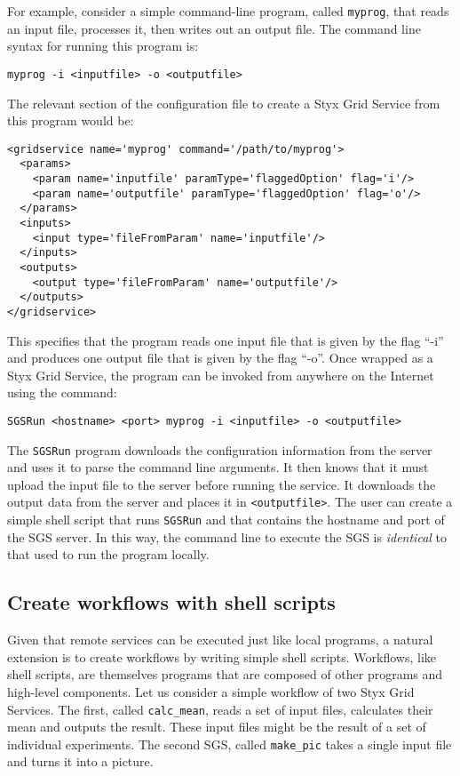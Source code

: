 \documentclass{llncs}
\begin{document}
For example, consider a simple command-line program, called {\tt myprog}, that reads an input file, processes it, then writes out an output file.  The command line syntax for running this program is:

\begin{verbatim}
myprog -i <inputfile> -o <outputfile>
\end{verbatim}

The relevant section of the configuration file to create a Styx Grid Service from this program would be:

\begin{verbatim}
<gridservice name='myprog' command='/path/to/myprog'>
  <params>
    <param name='inputfile' paramType='flaggedOption' flag='i'/>
    <param name='outputfile' paramType='flaggedOption' flag='o'/>
  </params>
  <inputs>
    <input type='fileFromParam' name='inputfile'/>
  </inputs>
  <outputs>
    <output type='fileFromParam' name='outputfile'/>
  </outputs>
</gridservice>
\end{verbatim}

This specifies that the program reads one input file that is given by the flag ``-i'' and produces one output file that is given by the flag ``-o''.  Once wrapped as a Styx Grid Service, the program can be invoked from anywhere on the Internet using the command:

\begin{verbatim}
SGSRun <hostname> <port> myprog -i <inputfile> -o <outputfile>
\end{verbatim}

The {\tt SGSRun} program downloads the configuration information from the server and uses it to parse the command line arguments.  It then knows that it must upload the input file to the server before running the service.  It downloads the output data from the server and places it in {\tt <outputfile>}.  The user can create a simple shell script that runs {\tt SGSRun} and that contains the hostname and port of the SGS server.  In this way, the command line to execute the SGS is {\em identical\/} to that used to run the program locally.

\subsection{Create workflows with shell scripts}
Given that remote services can be executed just like local programs, a natural extension is to create workflows by writing simple shell scripts.  Workflows, like shell scripts, are themselves programs that are composed of other programs and high-level components.  Let us consider a simple workflow of two Styx Grid Services.  The first, called {\tt calc\_mean}, reads a set of input files, calculates their mean and outputs the result.  These input files might be the result of a set of individual experiments.  The second SGS, called {\tt make\_pic} takes a single input file and turns it into a picture.
\end{document}
